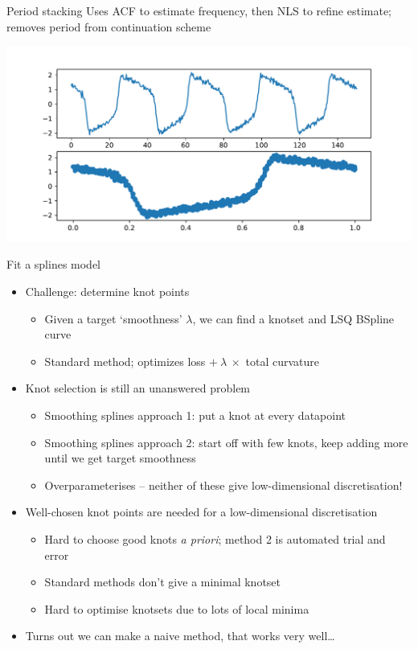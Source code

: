 \documentclass[presentation]{beamer}
\begin{document}
\begin{frame}[label={sec:org2660fde}]{Period stacking}
Uses ACF to estimate frequency, then NLS to refine estimate; removes period from continuation scheme

\begin{center}
\includegraphics[width=.9\linewidth]{./period_stack2.pdf}
\end{center}
\end{frame}

\begin{frame}[label={sec:org927f53d}]{Fit a splines model}
\begin{itemize}[<+->]
\item Challenge: determine knot points
\begin{itemize}
\item Given a target `smoothness' \(\lambda\), we can find a knotset and LSQ BSpline curve
\item Standard method; optimizes loss \(+~\lambda~\times\) total curvature
\end{itemize}
\item Knot selection is still an unanswered problem
\begin{itemize}
\item Smoothing splines approach 1: put a knot at every datapoint
\item Smoothing splines approach 2: start off with few knots, keep adding more until we get target smoothness
\item Overparameterises -- neither of these give low-dimensional discretisation!
\end{itemize}
\item Well-chosen knot points are needed for a low-dimensional discretisation
\begin{itemize}
\item Hard to choose good knots \emph{a priori}; method 2 is automated trial and error
\item Standard methods don't give a minimal knotset
\item Hard to optimise knotsets due to lots of local minima
\end{itemize}
\item \alert{Turns out we can make a naive method, that works very well\ldots{}}
\end{itemize}
\end{frame}
\end{document}
